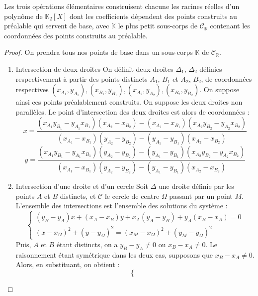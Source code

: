 \documentclass[a4paper,12pt,french,draft]{report}
\begin{document}
		\begin{proposition}
				Les trois opérations élémentaires construisent chacune les racines réelles d'un polynôme de \(\mathbb{K}_2[X]\) dont les coefficients dépendent des points construits au préalable qui servent de base, avec $\mathbb{K}$ le plus petit sous-corps de $\mathscr{C}_\mathbb{R}$ contenant les coordonnées des points construits au préalable.
		\end{proposition}
			\begin{proof}
					On prendra tous nos points de base dans un sous-corps $\mathbb{K}$ de $\mathscr{C}_\mathbb{R}$.
					\begin{enumerate}
						\item{Intersection de deux droites}
							On définit deux droites \( \Delta_1 \), \( \Delta_2 \) définies respectivement à partir des points distincts \(A_1\), \(B_1\) et \(A_2\), \(B_2\), de coordonnées respectives \( (x_{A_1}, y_{A_1}), (x_{B_1}, y_{B_1}), (x_{A_2}, y_{A_2}), (x_{B_2}, y_{B_2})\). On suppose ainsi ces points préalablement construits. On suppose les deux droites non parallèles. Le point d'intersection des deux droites est alors de coordonnées :
							\[
							x = \frac{(x_{A_1} y_{B_1}-y_{A_1} x_{B_1})(x_{A_2}-x_{B_2})-(x_{A_1}-x_{B_1})(x_{A_2} y_{B_2}-y_{A_2} x_{B_2})}{(x_{A_1}-x_{B_1})(y_{A_2}-y_{B_2})-(y_{A_1}-y_{B_1})(x_{A_2}-x_{B_2})}	
							\]
							\[ y=\frac{(x_{A_1}y_{B_1}-y_{A_1}								x_{B_1})(y_{A_2}-y_{B_2})-(y_{A_1}-y_{B_1})(x_{A_2} y_{B_2}-y_{A_2} x_{B_2})}{(x_{A_1}-x_{B_1})(y_{A_2}-y_{B_2})-(y_{A_1}-y_{B_1})(x_{A_2}-x_{B_2})}
							\]		
						\item{Intersection d'une droite et d'un cercle} Soit $\Delta$ une droite définie par les points $A$ et $B$ distincts, et $\mathcal{C}$ le cercle de centre $\Omega$ passant par un point $M$. L'ensemble des intersections est l'ensemble des solutions du système :
							\[
							\left \{
							\begin{array}{ll}
								(y_B - y_A)x + (x_A - x_B)y + x_A(y_A - y_B) + y_A(x_B-x_A) = 0
								\\
								(x-x_\Omega)^2 + (y-y_\Omega)^2 = (x_M - x_\Omega)^2 + (y_M - y_\Omega)^2
							\end{array}
							\right.
							\]
						Puis, $A$ et $B$ étant distincts, on a \(y_B - y_A \neq 0\) ou \(x_B - x_A \neq 0\). Le raisonnement étant symétrique dans les deux cas, supposons que \(x_B - x_A \neq 0\). Alors, en substituant, on obtient :
							\[
							\left \{
							\begin{array}{lllll}

\end{array}\]
\end{enumerate}
\end{proof}
\end{document}
